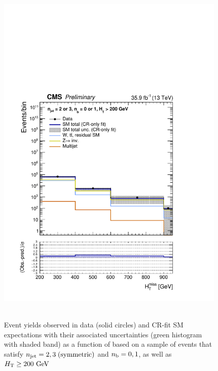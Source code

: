\clearpage
\begin{figure}[h!]
  \centering
  \caption{Event yields observed in data (solid circles) and CR-fit SM expectations with their associated uncertainties 
  (green histogram with shaded band) as a function of \HTmiss based on a sample of events that satisfy 
  $n_{\text{jet}} = 2, 3 \; \textrm{(symmetric)}$ and $n_{\text{b}} = 0, 1$, as well as $\mbox{$H_\text{T}$} \geq 200 \textrm{ GeV}$ }
  \includegraphics[width=0.8\linewidth]{figures/results/36invfb_preapproval/aggregated/postFitShapeCR/mhtShape_eq01b_eq23j_200_Inf_crfit.pdf} ~
\end{figure}

